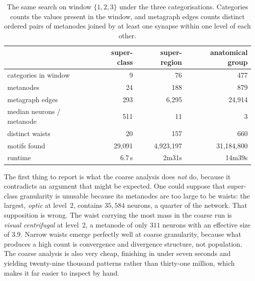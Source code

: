 \documentclass[12pt,a4paper,oneside]{article}
\theoremstyle{definition}
\theoremstyle{plain}
\begin{document}
\begin{table}[H]
\centering
\caption{The same search on window $\{1,2,3\}$ under the three
categorisations. Categories counts the values present in the window, and
metagraph edges counts distinct ordered pairs of metanodes joined by at least
one synapse within one level of each other.}
\label{tab:granularity}
\begin{tabular}{lrrr}
\toprule
 & super-class & super-region & anatomical group \\
\midrule
categories in window      & 9      & 76        & 477 \\
metanodes                 & 24     & 188       & 879 \\
metagraph edges           & 293    & 6{,}295   & 24{,}914 \\
median neurons / metanode & 511    & 11        & 3 \\
distinct waists           & 20     & 157       & 660 \\
motifs found              & 29{,}091 & 4{,}923{,}197 & 31{,}184{,}800 \\
runtime                   & 6.7\,s & 2m31s     & 14m39s \\
\bottomrule
\end{tabular}
\end{table}

The first thing to report is what the coarse analysis does \emph{not} do,
because it contradicts an argument that might be expected. One could suppose
that super-class granularity is unusable because its metanodes are too large
to be waists: the largest, \emph{optic} at level~2, contains $35{,}584$
neurons, a quarter of the network. That supposition is wrong. The waist
carrying the most mass in the coarse run is \emph{visual centrifugal} at
level~2, a metanode of only $311$ neurons with an effective size of $3.9$.
Narrow waists emerge perfectly well at coarse granularity, because what
produces a high count is convergence and divergence structure, not
population. The coarse analysis is also very cheap, finishing in under seven
seconds and yielding twenty-nine thousand patterns rather than thirty-one
million, which makes it far easier to inspect by hand.
\end{document}
